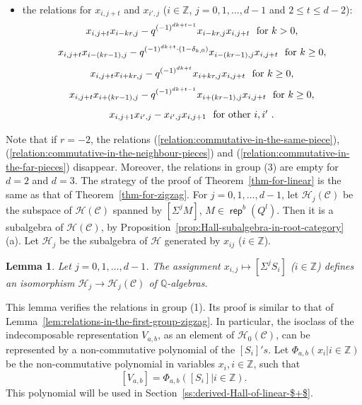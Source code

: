 \documentclass[reqno,12pt,a4paper]{amsart}
\newtheorem{lemma}[theorem]{Lemma}
\theoremstyle{remark}
\theoremstyle{definition}
\newcommand{\opname}[1]{\operatorname{\mathsf{#1}}}
\newcommand{\rep}{\opname{rep}\nolimits}
\newcommand{\cc}{{\mathcal C}}
\newcommand{\ch}{{\mathcal H}}
\numberwithin{equation}{section}
\begin{document}
\begin{itemize}
\item[(3)] the relations for $x_{i,j+t}$ and $x_{i',j}$ ($i\in\mathbb{Z}$, $j=0,1,\ldots,d-1$ and $2\leq t\leq d-2$):
  \begin{equation*}
  x_{i,j+t}x_{i-kr,j}-q^{(-1)^{dk+t-1}}x_{i-kr,j}x_{i,j+t} ~\hbox{ for } k>0,
  \end{equation*}
    \begin{equation*}
   x_{i,j+t}x_{i-(kr-1),j}-q^{(-1)^{dk+t}\cdot (1-\delta_{k,0})}x_{i-(kr-1),j}x_{i,j+t}~\hbox{ for } k\geq0,
  \end{equation*}
  \begin{equation*}
    x_{i,j+t}x_{i+kr,j}-q^{(-1)^{dk+t}}x_{i+kr,j}x_{i,j+t} ~\hbox{ for } k\geq0,
  \end{equation*}
   \begin{equation*}
   x_{i,j+t}x_{i+(kr-1),j}-q^{(-1)^{dk+t-1}}x_{i+(kr-1),j}x_{i,j+t} ~\hbox{ for } k\geq0,
  \end{equation*}
  \begin{equation}\label{relation:commutative-in-the-far-pieces}
    x_{i,j+1}x_{i',j}-x_{i',j}x_{i,j+1} ~\hbox{ for other $i, i'$ }.
  \end{equation}
\end{itemize}

Note that if $r=-2$, the relations (\ref{relation:commutative-in-the-same-piece}), (\ref{relation:commutative-in-the-neighbour-pieces}) and (\ref{relation:commutative-in-the-far-pieces}) disappear. Moreover, the relations in group (3) are empty for $d=2$ and $d=3$. The strategy of the proof of Theorem~\ref{thm-for-linear} is the same as that of Theorem~\ref{thm-for-zigzag}.
For $j=0,1,\ldots,d-1$, let $\ch_j(\cc)$ be the subspace of $\ch(\cc)$ spanned by $[\Sigma^j M]$, $M\in\rep^b(Q^l)$. Then it is a subalgebra of $\ch(\cc)$, by Proposition~\ref{prop:Hall-subalgebra-in-root-category} (a). Let $\ch_j$ be the subalgebra of $\ch$ generated by $x_{ij}$ ($i\in\mathbb{Z}$).

\begin{lemma}
\label{lem:relations-in-the-first-group-linear}
Let $j=0,1,\ldots,d-1$.
The assignment $x_{i,j}\mapsto [\Sigma^j S_i]$ ($i\in\mathbb{Z}$) defines an isomorphism $\ch_j\to\ch_j(\cc)$ of $\mathbb{Q}$-algebras.
\end{lemma}

This lemma verifies the relations in group (1). Its proof is similar to that of Lemma~\ref{lem:relations-in-the-first-group-zigzag}. In particular, the isoclass of the indecomposable representation $V_{a,b}$, as an element of $\ch_0(\cc)$, can be represented by a non-commutative polynomial of the $[S_i]'s$. Let $\Phi_{a,b}(x_i|i\in\mathbb{Z})$ be the non-commutative polynomial in variables $x_i,i\in\mathbb{Z}$, such that 
\begin{equation}\label{equation-for-indecomposable}
	[V_{a,b}]=\Phi_{a,b}([S_i]|i\in\mathbb{Z}).
\end{equation}
This polynomial will be used in Section~\ref{ss:derived-Hall-of-linear-$+$}.
\end{document}
